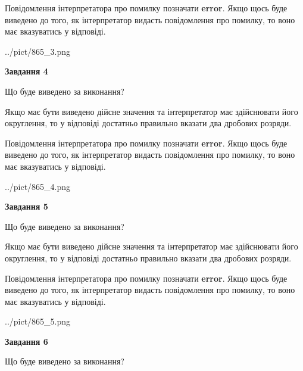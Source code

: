 \documentclass[12pt, ukrainian]{article}
\begin{document}
{\begin {Large}
Повідомлення інтерпретатора про помилку позначати \textbf{error}.
Якщо щось буде виведено до того, як інтерпретатор видасть повідомлення про помилку, 
то воно має вказуватись у відповіді. \par

\begin{center}
	{../pict/865_3.png}
\end{center}
\newpage

{\begin {center}\textbf{Завдання 4}\end {center}}\par
Що буде виведено за виконання? \par

Якщо має бути виведено дійсне значення та інтерпретатор має здійснювати його округлення, 
то у відповіді достатньо правильно вказати два дробових розряди.

Повідомлення інтерпретатора про помилку позначати \textbf{error}.
Якщо щось буде виведено до того, як інтерпретатор видасть повідомлення про помилку, 
то воно має вказуватись у відповіді. \par

\begin{center}
	{../pict/865_4.png}
\end{center}
\newpage

{\begin {center}\textbf{Завдання 5}\end {center}}\par
Що буде виведено за виконання? \par

Якщо має бути виведено дійсне значення та інтерпретатор має здійснювати його округлення, 
то у відповіді достатньо правильно вказати два дробових розряди.

Повідомлення інтерпретатора про помилку позначати \textbf{error}.
Якщо щось буде виведено до того, як інтерпретатор видасть повідомлення про помилку, 
то воно має вказуватись у відповіді. \par

\begin{center}
	{../pict/865_5.png}
\end{center}
\newpage

{\begin {center}\textbf{Завдання 6}\end {center}}\par
Що буде виведено за виконання? \par


\end{Large}}
\end{document}
